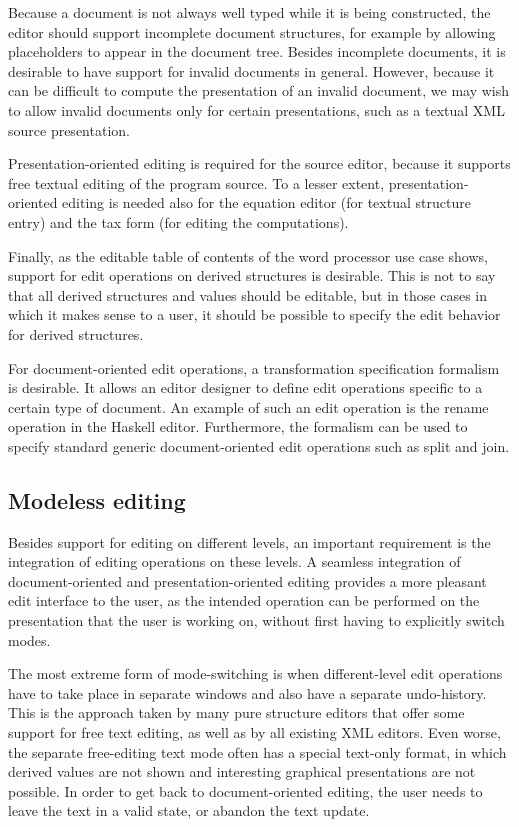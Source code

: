 Because a document is not always well typed while it is being constructed, the editor should support incomplete document structures, for example by allowing placeholders to appear in the document tree. Besides incomplete documents, it is desirable to have support for invalid documents in general. However, because it can be difficult to compute the presentation of an invalid document, we may wish to allow invalid documents only for certain presentations, such as a textual XML source presentation. 

Presentation-oriented editing is required for the source editor, because it supports free textual editing of the program source. To a lesser extent, presentation-oriented editing is needed also for the equation editor (for textual structure entry) and the tax form (for editing the computations). 

Finally, as the editable table of contents of the word processor use case shows, support for edit operations on derived structures is desirable. This is not to say that all derived structures and values should be editable, but in those cases in which it makes sense to a user, it should be possible to specify the edit behavior for derived structures.

For document-oriented edit operations, a transformation specification formalism is desirable. It allows an editor designer to define edit operations specific to a certain type of document. An example of such an edit operation is the rename operation in the Haskell editor. Furthermore, the formalism can be used to specify standard generic document-oriented edit operations such as split and join.


%																
\subsection{Modeless editing}

Besides support for editing on different levels, an important requirement is the integration of editing operations on these levels. A seamless integration of document-oriented and presentation-oriented editing provides a more pleasant edit interface to the user, as the intended operation can be performed on the presentation that the user is working on, without first having to explicitly switch modes.

The most extreme form of mode-switching is when different-level edit operations have to take place in separate windows and also have a separate undo-history. This is the approach taken by many pure structure editors that offer some support for free text editing, as well as by all existing XML editors. Even worse, the separate free-editing text mode often has a special text-only format, in which derived values are not shown and interesting graphical presentations are not possible. In order to get back to document-oriented editing, the user needs to leave the text in a valid state, or abandon the text update.

